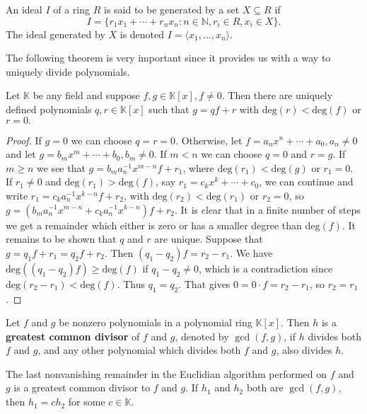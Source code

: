 \documentclass[english,bachelor]{liumaiex}
\begin{document}
\begin{define}
An ideal $I$ of a ring $R$ is said to be generated by a set $X \subseteq R$ if
\begin{displaymath}
I = \{r_1x_1+\cdots +r_nx_n : n \in \mathbb{N}, r_i \in R, x_i \in X\}.
\end{displaymath}
The ideal generated by $X$ is denoted $I = \langle x_1,\dots,x_n \rangle$.
\end{define}
The following theorem is very important since it provides us with a way to uniquely divide polynomials.
\begin{thm}
Let $\mathbb{K}$ be any field and suppose $f,g \in \mathbb{K}[x], f\neq 0.$ Then there are uniquely defined polynomials $q,r \in \mathbb{K}[x]$ such that $g = qf+r$ with $\textrm{deg}(r) < \textrm{deg}(f)$ or $r = 0.$
\end{thm}

\begin{proof}
If $g = 0$ we can choose $q=r=0$. Otherwise, let $f=a_nx^n+\cdots +a_0, a_n\neq 0$ and let $g=b_mx^m+\cdots +b_0, b_m\neq 0.$ If $m<n$ we can choose $q=0$ and $r=g$. If $m\geq n$ we see that $g=b_ma_n^{-1}x^{m-n}f+r_1$, where $\textrm{deg}(r_1)<\textrm{deg}(g)$ or $r_1=0.$ If $r_1\neq 0$ and $\textrm{deg}(r_1)>\textrm{deg}(f)$, say $r_1=c_kx^k+\cdots+c_0$, we can continue and write $r_1=c_ka_n^{-1}x^{k-n}f+r_2$, with $\textrm{deg}(r_2)<\textrm{deg}(r_1)$ or $r_2=0$, so $g=(b_ma_n^{-1}x^{m-n}+c_ka_n^{-1}x^{k-n})f+r_2.$ It is clear that in a finite number of steps we get a remainder which either is zero or has a smaller degree than $\textrm{deg}(f)$. It remains to be shown that $q$ and $r$ are unique. Suppose that $g=q_1f+r_1=q_2f+r_2.$ Then $(q_1-q_2)f=r_2-r_1.$ We have $\textrm{deg}((q_1-q_2)f)\geq \textrm{deg}(f)$ if $q_1-q_2\neq 0$, which is a contradiction since $\textrm{deg}(r_2-r_1)<\textrm{deg}(f).$ Thus $q_1=q_2$. That gives $0=0\cdot f=r_2-r_1$, so $r_2=r_1$.
\end{proof}

\begin{define}
Let $f$ and $g$ be nonzero polynomials in a polynomial ring $\mathbb{K}[x]$. Then $h$ is a \textbf{greatest common divisor} of $f$ and $g$, denoted by $\gcd(f,g)$, if $h$ divides both $f$ and $g$, and any other polynomial which divides both $f$ and $g$, also divides $h$.
\end{define}

\begin{thm}
The last nonvanishing remainder in the Euclidian algorithm performed on $f$ and $g$ is a greatest common divisor to $f$ and $g$. If $h_1$ and $h_2$ both are $\gcd(f,g)$, then $h_1=ch_2$ for some $c \in \mathbb{K}.$
\end{thm}
\end{document}
